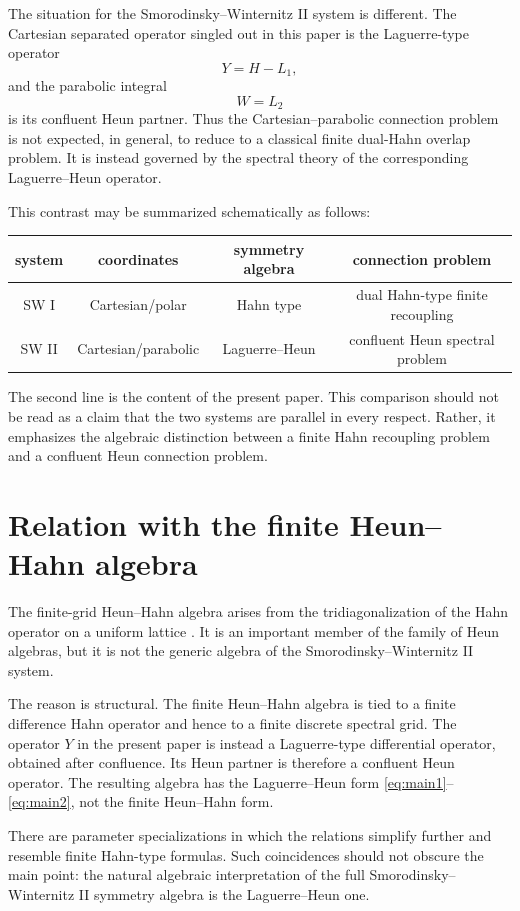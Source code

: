 \documentclass[11pt]{article}
\numberwithin{equation}{section}
\theoremstyle{definition}
\theoremstyle{remark}
\begin{document}
The situation for the Smorodinsky--Winternitz II system is different.  The
Cartesian separated operator singled out in this paper is the Laguerre-type
operator
\[
        Y=H-L_1,
\]
and the parabolic integral
\[
        W=L_2
\]
is its confluent Heun partner.  Thus the Cartesian--parabolic connection
problem is not expected, in general, to reduce to a classical finite
dual-Hahn overlap problem.  It is instead governed by the spectral theory of
the corresponding Laguerre--Heun operator.

This contrast may be summarized schematically as follows:
\begin{center}
\renewcommand{\arraystretch}{1.25}
\begin{tabular}{c|c|c|c}
system & coordinates & symmetry algebra & connection problem \\
\hline
SW I & Cartesian/polar & Hahn type &
dual Hahn-type finite recoupling \\
SW II & Cartesian/parabolic & Laguerre--Heun &
confluent Heun spectral problem
\end{tabular}
\end{center}
The second line is the content of the present paper.  This comparison should
not be read as a claim that the two systems are parallel in every respect.
Rather, it emphasizes the algebraic distinction between a finite Hahn
recoupling problem and a confluent Heun connection problem.

\section{Relation with the finite Heun--Hahn algebra}

The finite-grid Heun--Hahn algebra arises from the tridiagonalization of the
Hahn operator on a uniform lattice \cite{VZ2019}.  It is an important member
of the family of Heun algebras, but it is not the generic algebra of the
Smorodinsky--Winternitz II system.

The reason is structural.  The finite Heun--Hahn algebra is tied to a finite
difference Hahn operator and hence to a finite discrete spectral grid.  The
operator \(Y\) in the present paper is instead a Laguerre-type differential
operator, obtained after confluence.  Its Heun partner is
therefore a confluent Heun operator.  The resulting algebra has the
Laguerre--Heun form \eqref{eq:main1}--\eqref{eq:main2}, not the finite
Heun--Hahn form.

There are parameter specializations in which the relations simplify further
and resemble finite Hahn-type formulas.  Such coincidences should not obscure
the main point: the natural algebraic interpretation of the full
Smorodinsky--Winternitz II symmetry algebra is the Laguerre--Heun one.
\end{document}
